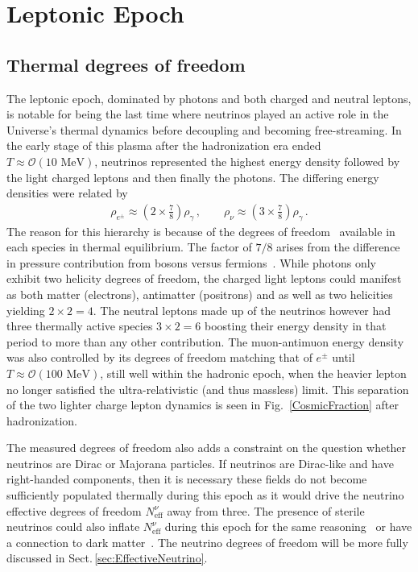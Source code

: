 \documentclass[universe,article,submit,moreauthors,pdftex,a4paper]{Definitions/mdpi}
\newcommand{\MeV}{\text{ MeV}}
\newcommand*{\rf}[1]{Fig.~{\ref{#1}}}
\newcommand*{\rsec}[1]{Sect.\,{\ref{#1}}}
\begin{document}
\section{Leptonic Epoch} \label{sec:Leptonic}
\subsection{Thermal degrees of freedom}\label{sec:Freedom}
\noindent The leptonic epoch, dominated by photons and both charged and neutral leptons, is notable for being the last time where neutrinos played an active role in the Universe's thermal dynamics before decoupling and becoming free-streaming. In the early stage of this plasma after the hadronization era ended $T\approx\mathcal{O}(10\MeV)$, neutrinos represented the highest energy density followed by the light charged leptons and then finally the photons. The differing energy densities were related by
\begin{align}
\rho_{e^{\pm}}\approx\left(2\times\frac{7}{8}\right)\rho_{\gamma}\,,\qquad\rho_{\nu}\approx\left(3\times\frac{7}{8}\right)\rho_{\gamma}\,.
\end{align}
The reason for this hierarchy is because of the degrees of freedom~\cite{Coleman:2003hs,Rafelski:2013yka} available in each species in thermal equilibrium. The factor of $7/8$ arises from the difference in pressure contribution from bosons versus fermions~\cite{Rafelski:2013yka}. While photons only exhibit two helicity degrees of freedom, the charged light leptons could manifest as both matter (electrons), antimatter (positrons) and as well as two helicities yielding $2\times2=4$. The neutral leptons made up of the neutrinos however had three thermally active species $3\times2=6$ boosting their energy density in that period to more than any other contribution. The muon-antimuon energy density was also controlled by its degrees of freedom matching that of $e^{\pm}$ until $T\approx\mathcal{O}(100\MeV)$, still well within the hadronic epoch, when the heavier lepton no longer satisfied the ultra-relativistic (and thus massless) limit. This separation of the two lighter charge lepton dynamics is seen in \rf{CosmicFraction} after hadronization.

The measured degrees of freedom also adds a constraint on the question whether neutrinos are Dirac or Majorana particles. If neutrinos are Dirac-like and have right-handed components, then it is necessary these fields do not become sufficiently populated thermally during this epoch as it would drive the neutrino effective degrees of freedom $N^{\nu}_{\mathrm{eff}}$ away from three. The presence of sterile neutrinos could also inflate $N_{\mathrm{eff}}^{\nu}$ during this epoch for the same reasoning~\cite{Kopp:2011qd,Hamann:2011ge,Kopp:2013vaa,Lello:2014yha,Birrell:2014qna} or have a connection to dark matter~\cite{Weinberg:2013kea,Giusarma:2014zza}. The neutrino degrees of freedom will be more fully discussed in \rsec{sec:EffectiveNeutrino}.
\end{document}
